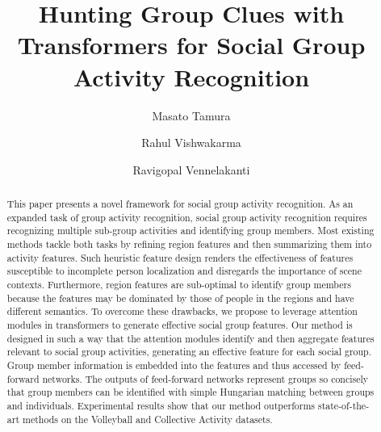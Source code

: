 \documentclass[runningheads]{llncs}
\makeatletter
\DeclareRobustCommand\onedot{\futurelet\@let@token\@onedot}
\def\@onedot{\ifx\@let@token.\else.\null\fi\xspace}
\def\etal{\emph{et al}\onedot}
\makeatother
\begin{document}
\pagestyle{headings}
\mainmatter

\title{Hunting Group Clues with Transformers for Social Group Activity Recognition}

\author{Masato Tamura \and
Rahul Vishwakarma \and
Ravigopal Vennelakanti}

\authorrunning{M. Tamura \etal}
\maketitle

\begin{abstract}
This paper presents a novel framework for social group activity recognition. As an expanded task of group activity recognition, social group activity recognition requires recognizing multiple sub-group activities and identifying group members.
Most existing methods tackle both tasks by refining region features and then summarizing them into activity features. Such heuristic feature design renders the effectiveness of features susceptible to incomplete person localization and disregards the importance of scene contexts. Furthermore, region features are sub-optimal to identify group members
because the features may be dominated by those of people in the regions and have different semantics.
To overcome these drawbacks, we propose to leverage attention modules in transformers to generate effective social group features. Our method is designed in such a way that the attention modules identify and then aggregate features relevant to social group activities, generating an effective feature for each social group. Group member information is embedded into the features and thus accessed by feed-forward networks. The outputs of feed-forward networks represent groups so concisely that group members can be identified with simple Hungarian matching between groups and individuals.
Experimental results show that our method outperforms state-of-the-art methods on the Volleyball and Collective Activity datasets.

\end{abstract}
\end{document}

